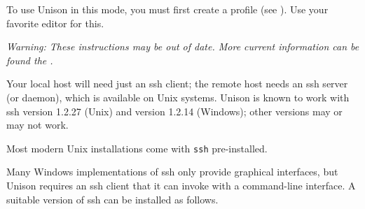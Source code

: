 \documentclass{article}
\begin{document}
To use Unison in this mode, you must first create a profile (see
).  Use your favorite editor for this.  


\appendix
{}

{\em Warning: These instructions may be out of date.  More current
  information can be found the
  .}

Your local host will need just an ssh client; the remote host needs an
ssh server (or daemon), which is available on Unix systems.  Unison is
known to work with ssh version 1.2.27 (Unix) and version 1.2.14
(Windows); other versions may or may not work.


Most modern Unix installations come with \verb|ssh| pre-installed.

Many Windows implementations of ssh only provide graphical interfaces,
but Unison requires an ssh client that it can invoke with a
command-line interface.  A suitable version of ssh can be installed as
follows.  
\end{document}
